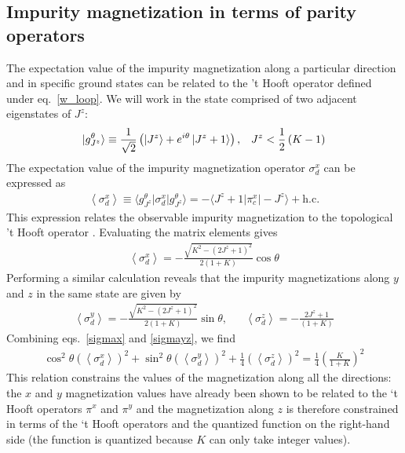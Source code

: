 \documentclass[reprint,prb,superscriptaddress]{revtex4-2}
\begin{document}
\subsection{Impurity magnetization in terms of parity operators}
The expectation value of the impurity magnetization along a particular direction and in specific ground states can be related to the 't Hooft operator defined under eq.~\ref{w_loop}. We will work in the state comprised of two adjacent eigenstates of \(J^z\):
\begin{equation}\begin{aligned}
	\ket{g^\theta_{J^z}} \equiv \frac{1}{\sqrt 2}\left( \ket{J^z} + e^{i\theta}\ket{J^z+1}\right), && J^z < \frac{1}{2}\left( K-1 \right)
\end{aligned}\end{equation}
The expectation value of the impurity magnetization operator \(\sigma_d^x\) can be expressed as
\begin{equation}\begin{aligned}
	\left<\sigma_d^x\right> \equiv \langle g^\theta_{J^z} \vert \sigma_d^x \vert g^\theta_{J^z}\rangle = - \langle J^z + 1 \vert \pi^x_c \vert -J^z \rangle + \text{h.c.}
\end{aligned}\end{equation}
This expression relates the observable impurity magnetization to the topological 't Hooft operator \cite{Maric2020}. Evaluating the matrix elements gives
\begin{equation}\begin{aligned}
	\label{sigmax}
	\left<\sigma_d^x\right> = - \frac{\sqrt{K^2 - (2J^z + 1)^2}}{2(1+K)}\cos \theta
\end{aligned}\end{equation}
Performing a similar calculation reveals that the impurity magnetizations along \(y\) and \(z\) in the same state are given by
\begin{equation}\begin{aligned}
	\label{sigmayz}
	\left<\sigma_d^y\right> = - \frac{\sqrt{K^2 - (2J^z + 1)^2}}{2(1+K)}\sin \theta, &&\left<\sigma_d^z\right> = - \frac{2J^z + 1}{(1+K)}
\end{aligned}\end{equation}
Combining eqs.~\ref{sigmax} and \ref{sigmayz}, we find
\begin{equation}\begin{aligned}
	\cos^2\theta\left(\left<\sigma^x_d\right>\right)^2 + \sin^2\theta\left(\left<\sigma^y_d\right>\right)^2 + \frac{1}{4}\left(\left<\sigma^z_d\right>\right)^2 = \frac{1}{4}\left(\frac{K}{1+K}\right)^2
\end{aligned}\end{equation}
This relation constrains the values of the magnetization along all the directions: the \(x\) and \(y\) magnetization values have already been shown to be related to the `t Hooft operators \(\pi^x\) and \(\pi^y\) and the magnetization along \(z\) is therefore constrained in terms of the `t Hooft operators and the quantized function on the right-hand side (the function is quantized because \(K\) can only take integer values).
\end{document}
